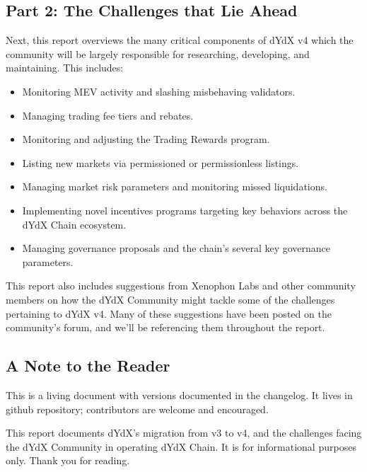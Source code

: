 \begin{fullwidth}
\begin{adjustwidth}{1cm}{1cm}
        \subsection*{Part 2: The Challenges that Lie Ahead} 
        
        Next, this report overviews the many critical components of dYdX v4 which the community will be largely responsible for researching, developing, and maintaining. This includes: %
    
        \begin{itemize}
            \item Monitoring MEV activity and slashing misbehaving validators.
            \item Managing trading fee tiers and rebates.
            \item Monitoring and adjusting the Trading Rewards program.
            \item Listing new markets via permissioned or permissionless listings.
            \item Managing market risk parameters and monitoring missed liquidations.
            \item Implementing novel incentives programs targeting key behaviors across the dYdX Chain ecosystem.
            \item Managing governance proposals and the chain's several key governance parameters.
        \end{itemize}
    
        This report also includes suggestions from Xenophon Labs and other community members on how the dYdX Community might tackle some of the challenges pertaining to dYdX v4. Many of these suggestions have been posted on the community's forum, and we'll be referencing them throughout the report. 
    
        \subsection*{A Note to the Reader} 
        
        This is a living document with versions documented in the changelog. It lives in  github repository; contributors are welcome and encouraged.
    
        \begin{center}
            \large
            This report documents dYdX's migration from v3 to v4, and the challenges facing the dYdX Community in operating dYdX Chain. It is for informational purposes only. Thank you for reading.
        \end{center}
    
    \end{adjustwidth}

\end{fullwidth}
